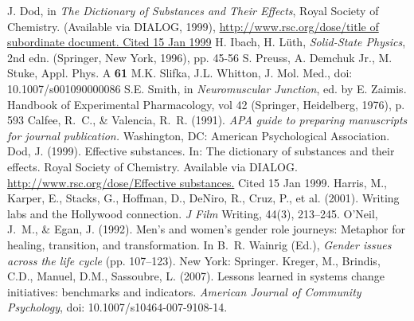 \begin{thebibliography}{99.}
   J. Dod, in \textit{The Dictionary of Substances and Their Effects}, Royal Society of Chemistry. (Available via DIALOG, 1999), 
  \url{http://www.rsc.org/dose/title of subordinate document. Cited 15 Jan 1999}
   H. Ibach, H. L\"uth, \textit{Solid-State Physics}, 2nd edn. (Springer, New York, 1996), pp. 45-56 
   S. Preuss, A. Demchuk Jr., M. Stuke, Appl. Phys. A \textbf{61}
   M.K. Slifka, J.L. Whitton, J. Mol. Med., doi: 10.1007/s001090000086
   S.E. Smith, in \textit{Neuromuscular Junction}, ed. by E. Zaimis. Handbook of Experimental Pharmacology, vol 42 (Springer, Heidelberg, 1976), p. 593
  \bigskip
   Calfee, R.~C., \& Valencia, R.~R. (1991). \textit{APA guide to preparing manuscripts for journal publication.} Washington, DC: American Psychological Association.
   Dod, J. (1999). Effective substances. In: The dictionary of substances and their effects. Royal Society of Chemistry. Available via DIALOG. \\
  \url{http://www.rsc.org/dose/Effective substances.} Cited 15 Jan 1999.
   Harris, M., Karper, E., Stacks, G., Hoffman, D., DeNiro, R., Cruz, P., et al. (2001). Writing labs and the Hollywood connection. \textit{J Film} Writing, 44(3), 213--245.
   O'Neil, J.~M., \& Egan, J. (1992). Men's and women's gender role journeys: Metaphor for healing, transition, and transformation. In B.~R. Wainrig (Ed.), \textit{Gender issues across the life cycle} (pp. 107--123). New York: Springer.
  Kreger, M., Brindis, C.D., Manuel, D.M., Sassoubre, L. (2007). Lessons learned in systems change initiatives: benchmarks and indicators. \textit{American Journal of Community Psychology}, doi: 10.1007/s10464-007-9108-14.

\end{thebibliography}
